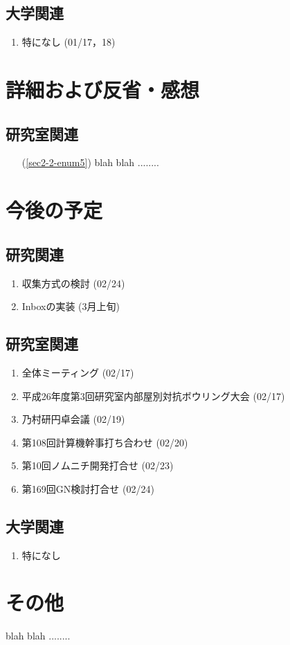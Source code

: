 \documentclass[fleqn, 14pt]{extarticle}
\begin{document}
\subsection{大学関連}
\label{sec2-3}
\begin{enumerate}
\item 特になし
  \hfill
  \label{sec2-3-enum1}
  (01/17，18)
\end{enumerate}

\section{詳細および反省・感想}
\label{sec3}
\subsection{研究室関連}
\label{sec3-1}
\begin{itemize}
\item[(\ref{sec2-2-enum5})]
blah blah ........ 

\end{itemize}

\section{今後の予定}
\label{sec4}
\subsection{研究関連}
\label{sec4-1}
\begin{enumerate}
\item 収集方式の検討
  \hfill
  \label{sec4-1-enum1}
  (02/24)
\item Inboxの実装
  \hfill
  \label{sec4-1-enum2}
  (3月上旬)
\end{enumerate}

\subsection{研究室関連}
\label{sec4-2}
\begin{enumerate}
\item 全体ミーティング
  \hfill
  \label{sec4-2-enum1}
  (02/17)
\item 平成26年度第3回研究室内部屋別対抗ボウリング大会
  \hfill
  \label{sec4-2-enum2}
  (02/17)
\item 乃村研円卓会議
  \hfill
  \label{sec4-2-enum3}
  (02/19)
\item 第108回計算機幹事打ち合わせ
  \hfill
  \label{sec4-2-enum4}
  (02/20)
\item 第10回ノムニチ開発打合せ
  \hfill
  \label{sec4-2-enum5}
  (02/23)
\item 第169回GN検討打合せ
  \hfill
  \label{sec4-2-enum6}
  (02/24)
\end{enumerate}

\subsection{大学関連}
\label{sec4-3}
\begin{enumerate}
\item 特になし
  \hfill
  \label{sec4-3-enum1}
\end{enumerate}

\section{その他}
blah blah ........ 
\end{document}
